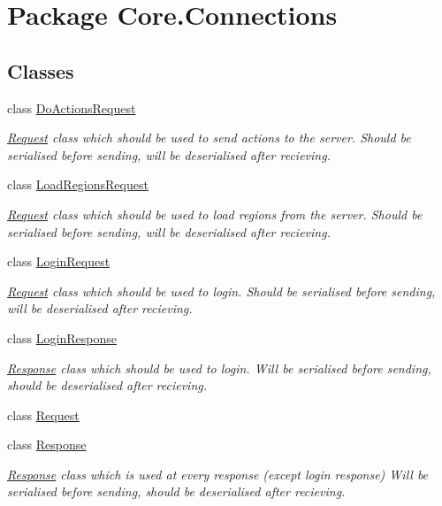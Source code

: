 \hypertarget{namespaceCore_1_1Connections}{\section{Package Core.\-Connections}
\label{namespaceCore_1_1Connections}
}
\subsection*{Classes}
\begin{DoxyCompactItemize}
\item 
class \hyperlink{classCore_1_1Connections_1_1DoActionsRequest}{Do\-Actions\-Request}
\begin{DoxyCompactList}\small\item\em \hyperlink{classCore_1_1Connections_1_1Request}{Request} class which should be used to send actions to the server. Should be serialised before sending, will be deserialised after recieving. \end{DoxyCompactList}\item 
class \hyperlink{classCore_1_1Connections_1_1LoadRegionsRequest}{Load\-Regions\-Request}
\begin{DoxyCompactList}\small\item\em \hyperlink{classCore_1_1Connections_1_1Request}{Request} class which should be used to load regions from the server. Should be serialised before sending, will be deserialised after recieving. \end{DoxyCompactList}\item 
class \hyperlink{classCore_1_1Connections_1_1LoginRequest}{Login\-Request}
\begin{DoxyCompactList}\small\item\em \hyperlink{classCore_1_1Connections_1_1Request}{Request} class which should be used to login. Should be serialised before sending, will be deserialised after recieving. \end{DoxyCompactList}\item 
class \hyperlink{classCore_1_1Connections_1_1LoginResponse}{Login\-Response}
\begin{DoxyCompactList}\small\item\em \hyperlink{classCore_1_1Connections_1_1Response}{Response} class which should be used to login. Will be serialised before sending, should be deserialised after recieving. \end{DoxyCompactList}\item 
class \hyperlink{classCore_1_1Connections_1_1Request}{Request}
\item 
class \hyperlink{classCore_1_1Connections_1_1Response}{Response}
\begin{DoxyCompactList}\small\item\em \hyperlink{classCore_1_1Connections_1_1Response}{Response} class which is used at every response (except login response) Will be serialised before sending, should be deserialised after recieving. \end{DoxyCompactList}\end{DoxyCompactItemize}
